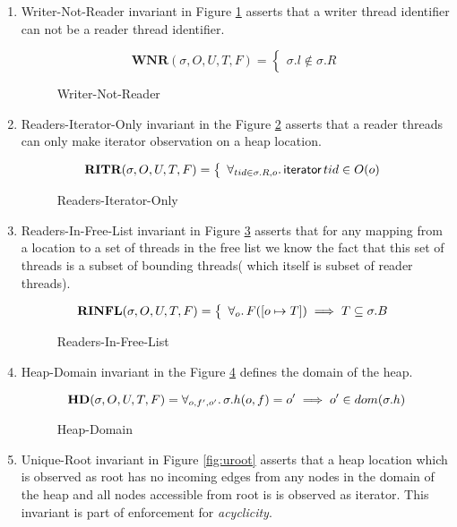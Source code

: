 \begin{enumerate}
\item{Writer-Not-Reader} invariant in Figure \ref{fig:wnr} asserts that a writer thread identifier can not be a reader thread identifier.
  \begin{figure}[!htb]
    \[
\textbf{WNR}(\sigma,O,U,T,F) =
\left\{
\begin{array}{ll}
 \sigma.l \notin \sigma.R
\end{array}
\right.%
\]
    \caption{Writer-Not-Reader}
\label{fig:wnr}
  \end{figure}
  \item{Readers-Iterator-Only} invariant in the Figure \ref{fig:riter} asserts that a reader threads can only make \textsf{iterator} observation on a heap location.
  \begin{figure}[!htb]
    \[
\textbf{RITR}(\sigma,O,U,T,F) =
\left\{
\begin{array}{ll}
 \forall_{tid \in \sigma.R,o}\ldotp \textsf{iterator} \, tid \in O(o) 
\end{array}
\right.%
\]
    \caption{Readers-Iterator-Only}
\label{fig:riter}
  \end{figure}
\item{Readers-In-Free-List} invariant in Figure \ref{fig:readerinflist} asserts that for any mapping from a location to a set of threads in the free list we know the fact that  this set of threads is a subset of bounding threads( which itself is subset of reader threads).
\begin{figure}[!htb]
  \[
\textbf{RINFL}(\sigma,O,U,T,F) =
\left\{
\begin{array}{ll}
  \forall_{o} \ldotp F([o \mapsto T]) \implies T \subseteq \sigma.B
\end{array}
\right.%
\]
\caption{Readers-In-Free-List}
\label{fig:readerinflist}
\end{figure}
\item{Heap-Domain} invariant in the Figure \ref{fig:dreachable} defines the domain of the heap.
\begin{figure}[!htb]
\[
\textbf{HD}(\sigma,O,U,T,F) =
\forall_{o,f',o'} \ldotp  \sigma.h(o,f) = o' \implies  o' \in dom(\sigma.h)
\]
    \caption{Heap-Domain}
\label{fig:dreachable}
\end{figure}
\item{Unique-Root} invariant in Figure \ref{fig:uroot} asserts that a heap location which is observed as \textsf{root} has no incoming edges from any nodes in the domain of the heap and all nodes accessible from root is is observed as \textsf{iterator}. This invariant is part of enforcement for \emph{acyclicity}.

\end{enumerate}
